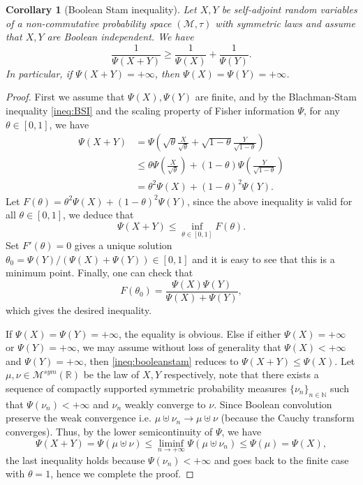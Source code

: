 \documentclass[10pt, reqno]{amsart}
\numberwithin{equation}{section}
\theoremstyle{definition}
\theoremstyle{plain}
\newtheorem{corollary}[definition]{Corollary}
\theoremstyle{remark}
\newcommand{\R}{\mathbb{R}}
\newcommand{\N}{\mathbb{N}}
\newcommand{\1}{\mathbbm{1}}
\newcommand{\probmsymr}{\mathcal{M}^{sym}(\R)}
\begin{document}
    \begin{corollary}[Boolean Stam inequality]\label{cor:booleanstam}
	Let $X,Y$ be self-adjoint random variables of a non-commutative probability space $(\mathcal{M},\tau)$ with symmetric laws and assume that $X,Y$ are Boolean independent. We have
	\begin{equation}\label{ineq:booleanstam}
		\frac{1}{\Psi(X+Y)}\ge \frac{1}{\Psi(X)} + \frac{1}{\Psi(Y)}.
	\end{equation}
    In particular, if $\Psi(X+Y)=+\infty$, then $\Psi(X)=\Psi(Y)=+\infty$.
	\end{corollary}
	\begin{proof}
		First we assume that $\Psi(X),\Psi(Y)$ are finite, and by the Blachman-Stam inequality \eqref{ineq:BSI} and the scaling property of Fisher information $\Psi$, for any $\theta\in [0,1]$, we have
		\begin{align*}
			\Psi(X+Y) &= \Psi\left(\sqrt{\theta}\frac{X}{\sqrt{\theta}} + \sqrt{1-\theta}\frac{Y}{\sqrt{1-\theta}} \right)\\
			&\le \theta \Psi\left( \frac{X}{\sqrt{\theta}} \right) + (1-\theta)\Psi\left( \frac{Y}{\sqrt{1-\theta}} \right)\\
			&= \theta^2\Psi(X) + (1-\theta)^2\Psi(Y).
		\end{align*}
        Let $F(\theta)= \theta^2\Psi(X) + (1-\theta)^2\Psi(Y) $, since the above inequality is valid for all $\theta\in [0,1]$, we deduce that 
		\begin{equation*}
			\Psi(X+Y)\le \inf_{\theta\in [0,1]}F(\theta).
		\end{equation*}
		Set $F'(\theta) = 0$ gives a unique solution $\theta_0 = \Psi(Y)/(\Psi(X)+\Psi(Y))\in [0,1] $ and it is easy to see that this is a minimum point. Finally, one can check that
		\begin{equation*}
			F(\theta_0) = \frac{\Psi(X)\Psi(Y)}{\Psi(X)+\Psi(Y)},
		\end{equation*}
        which gives the desired inequality.
        
		If $\Psi(X)=\Psi(Y)=+\infty$, the equality is obvious. Else if either $\Psi(X)=+\infty$ or $\Psi(Y)=+\infty$, we may assume without loss of generality that $\Psi(X)<+\infty$ and $\Psi(Y)=+\infty$, then \eqref{ineq:booleanstam} reduces to $\Psi(X+Y)\le \Psi(X)$. Let $\mu,\nu\in \probmsymr$ be the law of $X,Y$ respectively, note that there exists a sequence of compactly supported symmetric probability measures $\{\nu_n\}_{n\in \N}$ such that $\Psi(\nu_n)<+\infty$ and $\nu_n$ weakly converge to $\nu$. Since Boolean convolution preserve the weak convergence i.e. $\mu\uplus \nu_n\longrightarrow \mu\uplus \nu$ (because the Cauchy transform converges). Thus, by the lower semicontinuity of $\Psi$, we have
        \begin{equation}
            \Psi(X+Y)=\Psi(\mu\uplus\nu)\le \liminf_{n\to+\infty}\Psi(\mu\uplus\nu_n)\le \Psi(\mu)=\Psi(X),
        \end{equation}
		the last inequality holds because $\Psi(\nu_n)<+\infty$ and goes back to the finite case with $\theta=1$, hence we complete the proof.
	\end{proof}
    
\end{document}
